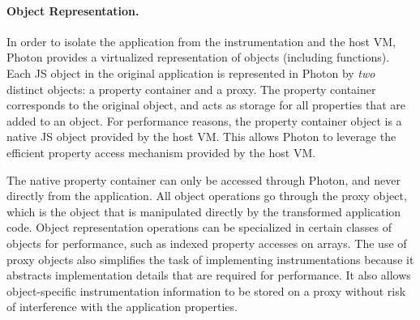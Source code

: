 \paragraph{Object Representation.} In order to isolate the application from
the instrumentation and the host VM, Photon provides a virtualized
representation of objects (including functions). Each JS object in the
original application is represented in Photon by \emph{two} distinct objects:
a property container and a proxy. The property container corresponds to the
original object, and acts as storage for all properties that are added to an
object. For performance reasons, the property container object is a native JS
object provided by the host VM. This allows Photon to leverage the efficient
property access mechanism provided by the host VM.

%
The native property container can only be accessed through Photon, and never
directly from the application. All object operations go through the proxy
object, which is the object that is manipulated directly by the transformed
application code.  Object representation operations can be specialized in
certain classes of objects for performance, such as indexed property accesses
on arrays. The use of proxy objects also simplifies the task of implementing
instrumentations because it abstracts implementation details that are required
for performance.  It also allows object-specific instrumentation information to
be stored on a proxy without risk of interference with the application
properties.


